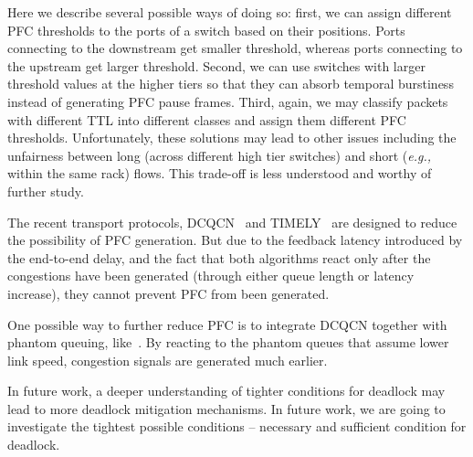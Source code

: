 Here we describe several possible ways of doing so: first, we can assign different PFC thresholds to 
the ports of a switch based on their positions. Ports connecting to the downstream get smaller threshold, 
whereas ports connecting to the upstream get larger threshold. 
Second, we can use switches with larger threshold values at the higher tiers so that they can absorb 
temporal burstiness instead of generating PFC pause frames. Third, again, we may classify 
packets with different TTL into different classes and assign them different PFC thresholds.
Unfortunately, these solutions may lead to other issues including the unfairness between long (across 
different high tier switches) and short ({\em e.g.,} within the same rack) flows. 
This trade-off is less understood and worthy of further study.




The recent transport protocols, DCQCN~\cite{dcqcn} and TIMELY~\cite{timely} are designed to reduce 
the possibility of PFC generation. But due to the feedback 
latency introduced by the end-to-end delay, and the fact that both algorithms react only after the 
congestions have been generated (through either queue length or latency increase), they cannot prevent PFC 
from been generated. 

One possible way to further reduce PFC is to integrate DCQCN together with 
phantom queuing, like~\cite{Alizadeh12}. By reacting to the phantom queues that assume lower link speed, 
congestion signals are generated much earlier. 

 In future work, a deeper understanding of tighter conditions 
for deadlock may lead to more deadlock mitigation mechanisms. In future work, we are going to 
investigate the tightest possible conditions -- necessary and sufficient condition for deadlock. 